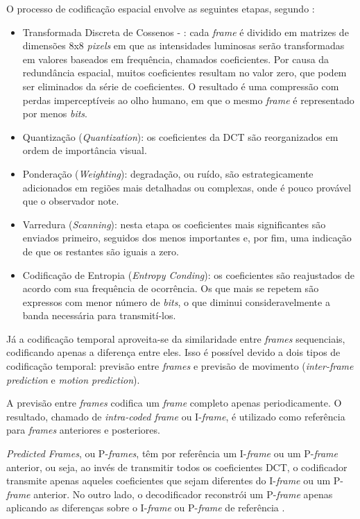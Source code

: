 O processo de codificação espacial envolve as seguintes etapas, segundo \cite{mpeg2ref}:
\begin{itemize}
    \item Transformada Discreta de Cossenos - : cada \emph{frame} é dividido em matrizes de dimensões 8x8 \emph{pixels} em que as intensidades luminosas serão transformadas em valores baseados em frequência, chamados coeficientes. Por causa da redundância espacial, muitos coeficientes resultam no valor zero, que podem ser eliminados da série de coeficientes. O resultado é uma compressão com perdas imperceptíveis ao olho humano, em que o mesmo \emph{frame} é representado por menos \emph{bits}.
    \item Quantização (\emph{Quantization}): os coeficientes da DCT são reorganizados em ordem de importância visual.
    \item Ponderação (\emph{Weighting}): degradação, ou ruído, são estrategicamente adicionados em regiões mais detalhadas ou complexas, onde é pouco provável que o observador note. 
    \item Varredura (\emph{Scanning}): nesta etapa os coeficientes mais significantes são enviados primeiro, seguidos dos menos importantes e, por fim, uma indicação de que os restantes são iguais a zero.
    \item Codificação de Entropia (\emph{Entropy Conding}): os coeficientes são reajustados de acordo com sua frequência de ocorrência. Os que mais se repetem são expressos com menor número de \emph{bits}, o que diminui consideravelmente a banda necessária para transmití-los.
\end{itemize}

Já a codificação temporal aproveita-se da similaridade entre \emph{frames} sequenciais, codificando apenas a diferença entre eles. Isso é possível devido a dois tipos de codificação temporal: previsão entre \emph{frames} e previsão de movimento (\emph{inter-frame prediction} e \emph{motion prediction}).

A previsão entre \emph{frames} codifica um \emph{frame} completo apenas periodicamente. O resultado, chamado de \emph{intra-coded frame} ou I-\emph{frame}, é utilizado como referência para \emph{frames} anteriores e posteriores.

\emph{Predicted Frames}, ou P-\emph{frames}, têm por referência um I-\emph{frame} ou um P-\emph{frame} anterior, ou seja, ao invés de transmitir todos os coeficientes DCT, o codificador transmite apenas aqueles coeficientes que sejam diferentes do I-\emph{frame} ou um P-\emph{frame} anterior. No outro lado, o decodificador reconstrói um P-\emph{frame} apenas aplicando as diferenças sobre o I-\emph{frame} ou P-\emph{frame} de referência \cite{mpeg2ref}.

